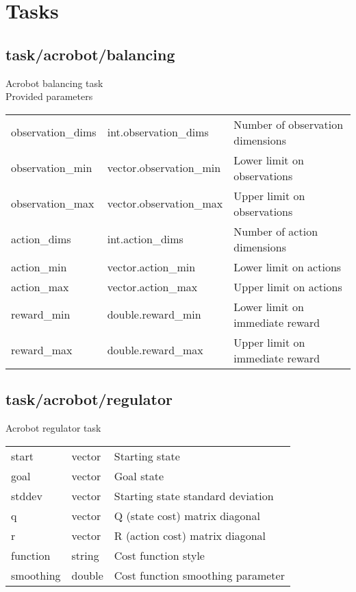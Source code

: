 \section{Tasks}
\subsection{task/acrobot/balancing}
\noindent Acrobot balancing task\\

\noindent Provided parameters\\

\noindent\begin{tabular}{@{}lll@{}}
observation\_dims&int.observation\_dims&Number of observation dimensions\\
observation\_min&vector.observation\_min&Lower limit on observations\\
observation\_max&vector.observation\_max&Upper limit on observations\\
action\_dims&int.action\_dims&Number of action dimensions\\
action\_min&vector.action\_min&Lower limit on actions\\
action\_max&vector.action\_max&Upper limit on actions\\
reward\_min&double.reward\_min&Lower limit on immediate reward\\
reward\_max&double.reward\_max&Upper limit on immediate reward\\
\end{tabular}
\subsection{task/acrobot/regulator}
\noindent Acrobot regulator task\\

\noindent\begin{tabular}{@{}lll@{}}
start&vector&Starting state\\
goal&vector&Goal state\\
stddev&vector&Starting state standard deviation\\
q&vector&Q (state cost) matrix diagonal\\
r&vector&R (action cost) matrix diagonal\\
function&string&Cost function style\\
smoothing&double&Cost function smoothing parameter\\
\end{tabular}
\\

